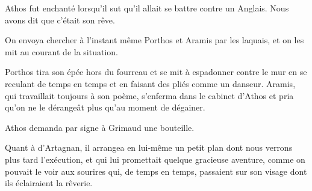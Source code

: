 Athos fut enchanté lorsqu'il sut qu'il allait se battre contre un Anglais. Nous avons dit que c'était son rêve. 

On envoya chercher à l'instant même Porthos et Aramis par les laquais, et on les mit au courant de la situation. 

Porthos tira son épée hors du fourreau et se mit à espadonner contre le mur en se reculant de temps en temps et en faisant des pliés comme un danseur. Aramis, qui travaillait toujours à son poème, s'enferma dans le cabinet d'Athos et pria qu'on ne le dérangeât plus qu'au moment de dégainer. 

Athos demanda par signe à Grimaud une bouteille. 

Quant à d'Artagnan, il arrangea en lui-même un petit plan dont nous verrons plus tard l'exécution, et qui lui promettait quelque gracieuse aventure, comme on pouvait le voir aux sourires qui, de temps en temps, passaient sur son visage dont ils éclairaient la rêverie.
